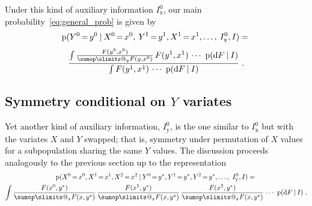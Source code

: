 \documentclass[\ifafour a4paper,12pt,\else a5paper,10pt,\fi%
onecolumn,oneside,article,%
british%
]{memoir}
\makeatletter
\theoremstyle{remark}
\theoremstyle{innote}
\def\sum{\DOTSI\sumop\slimits@}
\newcommand*{\di}{\mathrm{d}}%
\newcommand*{\p}{\mathrm{p}}%
\renewcommand*{\|}[1][]{\nonscript\:#1\vert\nonscript\:\mathopen{}}
\newcommand*{\mo}[1][=]{\mathord{\,#1\,}}
\newcommand*{\Ix}{I_{\textrm{x}}}
\newcommand*{\Iy}{I_{\textrm{y}}}
\makeatother
\begin{document}
Under this kind of auxiliary information $\Ix^{0}$, our main probability~\eqref{eq:general_prob} is given by
\begin{multline}
  \label{eq:general_prob_partialexch}
  \p(Y^{0}\mo y^{0} \|
  X^{0}\mo x^{0},\: Y^{1}\mo y^{1},X^{1}\mo x^{1},\dotsc,\: \Ix^{0},I)
  =
{}\\[\jot]
  \frac{
    \int \frac{F(y^{0},x^{0})}{\sum_{y}F(y,x^{0})}\, F(y^{1},x^{1})\,\dotsm\  \p(\di F \|I)
  }{
    \int F(y^{1},x^{1})\,\dotsm\  \p(\di F \|I)
  } \ .
\end{multline}

\subsection{Symmetry conditional on $Y$ variates}
\label{sec:unit0_condY}

Yet another kind of auxiliary information, $\Iy^{0}$, is the one similar to $\Ix^{0}$ but with the variates $X$ and $Y$ swapped; that is, symmetry under permutation of $X$ values for a subpopulation sharing the same $Y$ values. The discussion proceeds analogously to the previous section up to the representation
  \begin{multline}
    \label{eq:deFinetti_integral_partialY}
    \p(X^{0}\mo x^{0}, X^{1}\mo x^{1}, X^{2}\mo x^{2}
    \|
    Y^{0}\mo y^{*}, Y^{1}\mo y^{*},Y^{2}\mo y^{*},
    \dotsc,\  \Iy^{0},I) =
    {}\\
    \int
    \frac{F(x^{0},y^{*})}{\sum_{x}F(x,y^{*})}\,
    \frac{F(x^{1},y^{*})}{\sum_{x}F(x,y^{*})}\,
    \frac{F(x^{2},y^{*})}{\sum_{x}F(x,y^{*})}
    \,\dotsm\ \p(\di F \|I) \ .
  \end{multline}
\end{document}
